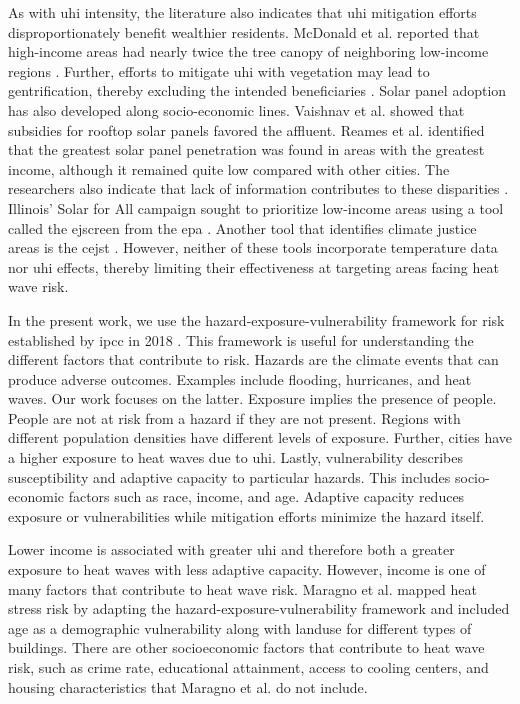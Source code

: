 As with \ac{uhi} intensity, the literature also indicates that \ac{uhi} mitigation
efforts disproportionately benefit wealthier residents. McDonald et al. reported
that high-income areas had nearly twice the tree canopy of neighboring low-income
regions \cite{mcdonald_tree_2021}. Further, efforts to mitigate \ac{uhi} with
vegetation may lead to gentrification, thereby excluding the intended beneficiaries
\cite{chakraborty_disproportionately_2019}. Solar panel adoption has also developed
along socio-economic lines. Vaishnav et al. \cite{vaishnav_was_2017} showed that
subsidies for rooftop solar panels favored the affluent. Reames et al.
\cite{reames_distributional_2020} identified that the greatest solar panel
penetration was found in areas with the greatest income, although it remained
quite low compared with other cities. The researchers also indicate that lack
of information contributes to these disparities \cite{vaishnav_was_2017,reames_distributional_2020}.
Illinois' Solar for All campaign sought to prioritize low-income areas using a
tool called the \ac{ejscreen} from the \ac{epa} \cite{us_epa_ejscreen_2014}. Another
tool that identifies climate justice areas is the \ac{cejst}
\cite{council_on_environmental_quality_climate_nodate}. However, neither of these
tools incorporate temperature data nor \ac{uhi} effects, thereby limiting their
effectiveness at targeting areas facing heat wave risk.

In the present work, we use the hazard-exposure-vulnerability framework for
risk established by \ac{ipcc} in 2018 \cite{viner_understanding_2020}. This
framework is useful for understanding the different factors that contribute to
risk. Hazards are the climate events that can produce adverse outcomes. Examples
include flooding, hurricanes, and heat waves. Our work focuses on the latter.
Exposure implies the presence of people. People are not at risk from a hazard if
they are not present. Regions with different population densities have different
levels of exposure. Further, cities have a higher exposure to heat waves due to
\ac{uhi}. Lastly, vulnerability describes susceptibility and adaptive capacity to
particular hazards. This includes socio-economic factors such as race, income,
and age. Adaptive capacity reduces exposure or vulnerabilities while mitigation
efforts minimize the hazard itself.

Lower income is associated with greater \ac{uhi} and therefore
both a greater exposure to heat waves with less adaptive capacity. However, income
is one of many factors that contribute to heat wave risk. Maragno et al.
\cite{maragno_mapping_2020} mapped heat stress risk by adapting the
hazard-exposure-vulnerability framework and included age as a demographic vulnerability
along with landuse for different types of buildings. There are other
socioeconomic factors that contribute to heat wave risk, such as crime rate,
educational attainment, access to cooling centers, and housing characteristics
\cite{klinenberg_heat_2003,gronlund_racial_2014} that Maragno et al. do not include.

